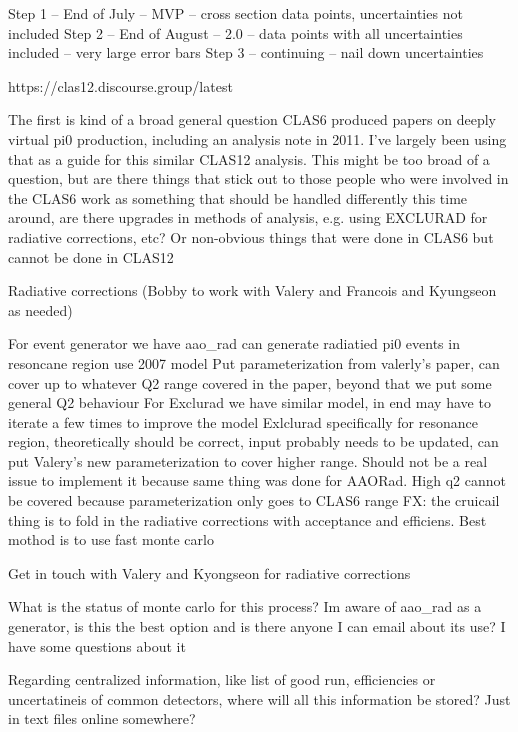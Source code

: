 Step 1 – End of July – MVP – cross section data points, uncertainties not included
Step 2 – End of August – 2.0 – data points with all uncertainties included – very large error bars
Step 3 – continuing – nail down uncertainties


https://clas12.discourse.group/latest



The first is kind of a broad general question
CLAS6 produced papers on deeply virtual pi0 production, including an analysis note in 2011. I’ve largely been using that as a guide for this similar CLAS12 analysis. This might be too broad of a question, but are there things that stick out to those people who were involved in the CLAS6 work as something that should be handled differently this time around, are there upgrades in methods of analysis, e.g. using EXCLURAD for radiative corrections, etc? Or non-obvious things that were done in CLAS6 but cannot be done in CLAS12

Radiative corrections (Bobby to work with Valery and Francois and Kyungseon as needed)

For event generator we have aao_rad can generate radiatied pi0 events in resoncane region use 2007 model
Put parameterization from valerly’s paper, can cover up to whatever Q2 range covered in the paper, beyond that we put some general Q2 behaviour
For Exclurad we have similar model, in end may have to iterate a few times to improve the model
Exlclurad specifically for resonance region, theoretically should be correct, input probably needs to be updated, can put Valery’s new parameterization to cover higher range. Should not be a real issue to implement it because same thing was done for AAORad. High q2 cannot be covered because parameterization only goes to CLAS6 range
FX: the cruicail thing is to fold in the radiative corrections with acceptance and efficiens. Best mothod is to use fast monte carlo

Get in touch with Valery and Kyongseon for radiative corrections



What is the status of monte carlo for this process? Im aware of aao_rad as a generator, is this the best option and is there anyone I can email about its use? I have some questions about it




Regarding centralized information, like list of good run, efficiencies or uncertatineis of common detectors, where will all this information be stored? Just in text files online somewhere?




